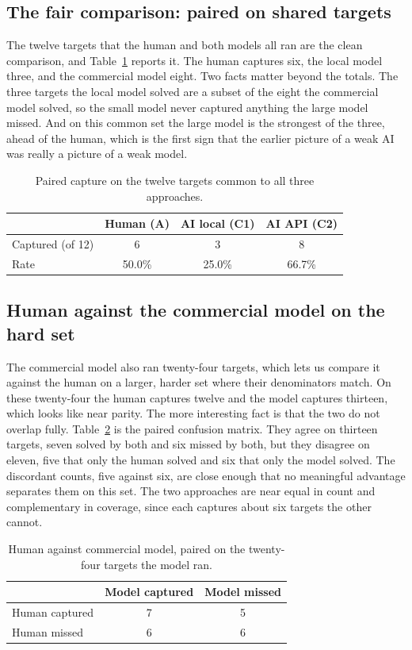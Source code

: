 \documentclass[11pt]{article}
\begin{document}
\subsection{The fair comparison: paired on shared targets}
The twelve targets that the human and both models all ran are the clean comparison, and Table~\ref{tab:paired} reports it. The human captures six, the local model three, and the commercial model eight. Two facts matter beyond the totals. The three targets the local model solved are a subset of the eight the commercial model solved, so the small model never captured anything the large model missed. And on this common set the large model is the strongest of the three, ahead of the human, which is the first sign that the earlier picture of a weak AI was really a picture of a weak model.

\begin{table}[htbp]
\centering
\caption{Paired capture on the twelve targets common to all three approaches.}
\label{tab:paired}
\small
\begin{tabular}{@{}lccc@{}}
\toprule
 & Human (A) & AI local (C1) & AI API (C2) \\
\midrule
Captured (of 12) & 6 & 3 & 8 \\
Rate & 50.0\% & 25.0\% & 66.7\% \\
\bottomrule
\end{tabular}
\end{table}

\subsection{Human against the commercial model on the hard set}
The commercial model also ran twenty-four targets, which lets us compare it against the human on a larger, harder set where their denominators match. On these twenty-four the human captures twelve and the model captures thirteen, which looks like near parity. The more interesting fact is that the two do not overlap fully. Table~\ref{tab:headtohead} is the paired confusion matrix. They agree on thirteen targets, seven solved by both and six missed by both, but they disagree on eleven, five that only the human solved and six that only the model solved. The discordant counts, five against six, are close enough that no meaningful advantage separates them on this set. The two approaches are near equal in count and complementary in coverage, since each captures about six targets the other cannot.

\begin{table}[htbp]
\centering
\caption{Human against commercial model, paired on the twenty-four targets the model ran.}
\label{tab:headtohead}
\small
\begin{tabular}{@{}lcc@{}}
\toprule
 & Model captured & Model missed \\
\midrule
Human captured & 7 & 5 \\
Human missed   & 6 & 6 \\
\bottomrule
\end{tabular}
\end{table}
\end{document}
